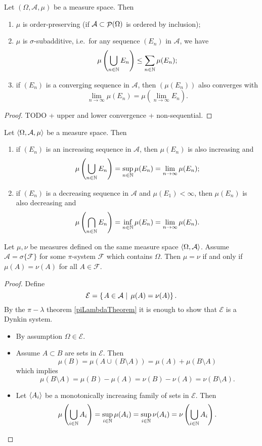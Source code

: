 \begin{proposition} \label{measures}
Let $(\Omega, \mathcal{A}, \mu)$ be a measure space. Then
\begin{enumerate}
\item $\mu$ is order-preserving (if $\mathcal{A}\subset \mathop{\mathcal{P}}(\Omega)$ is ordered by inclusion);
\item $\mu$ is $\sigma$-subadditive, i.e.\ for any sequence $(E_n)$ in $\mathcal{A}$, we have
\[ \mu\left(\bigcup_{n\in\mathbb{N}}E_n\right) \leq \sum_{n\in\mathbb{N}}\mu(E_n); \]
\item if $(E_n)$ is a converging sequence in $\mathcal{A}$, then $(\mu(E_n))$ also converges with
\[ \lim_{n\to\infty}\mu(E_n) = \mu\left(\lim_{n\to\infty}E_n\right). \]
\end{enumerate}
\end{proposition}
\begin{proof}
TODO + upper  and lower convergence + non-sequential.
\end{proof}
\begin{corollary}
Let $\left\langle \Omega, \mathcal{A}, \mu \right\rangle$ be a measure space. Then
\begin{enumerate}
\item if $(E_n)$ is an increasing sequence in $\mathcal{A}$, then $\mu(E_n)$ is also increasing and
\[ \mu\left(\bigcup_{n\in\mathbb{N}}E_n\right) = \sup_{n\in\mathbb{N}}\mu(E_n) = \lim_{n\to\infty}\mu(E_n); \]
\item if $(E_n)$ is a decreasing sequence in $\mathcal{A}$ and $\mu(E_1)<\infty$, then $\mu(E_n)$ is also decreasing and
\[ \mu\left(\bigcap_{n\in\mathbb{N}}E_n\right) = \inf_{n\in\mathbb{N}}\mu(E_n) = \lim_{n\to\infty}\mu(E_n). \]
\end{enumerate}
\end{corollary}
\begin{corollary}
Let $\mu,\nu$ be measures defined on the same measure space $\left\langle \Omega, \mathcal{A} \right\rangle$. Assume $\mathcal{A} = \sigma\{\mathcal{F}\}$ for some $\pi$-system $\mathcal{F}$ which contains $\Omega$. Then $\mu = \nu$ \textup{if and only if} $\mu(A) = \nu(A)$ for all $A\in\mathcal{F}$.
\end{corollary}
\begin{proof}
Define
\[ \mathcal{E} = \left\{\left. A\in\mathcal{A} \;\right|\; \mu(A) = \nu(A) \right\}. \]
By the $\pi-\lambda$ theorem \ref{piLambdaTheorem} it is enough to show that $\mathcal{E}$ is a Dynkin system.
\begin{itemize}
\item By assumption $\Omega\in \mathcal{E}$.
\item Assume $A\subset B$ are sets in $\mathcal{E}$. Then
\[ \mu(B) = \mu(A \cup (B\setminus A)) = \mu(A) + \mu(B\setminus A) \]
which implies
\[ \mu(B\setminus A) = \mu(B) - \mu(A) = \nu(B) - \nu(A) = \nu(B\setminus A). \]
\item Let $\left\langle A_i \right\rangle$ be a monotonically increasing family of sets in $\mathcal{E}$. Then
\[ \mu\left(\bigcup_{i\in\mathbb{N}}A_i\right) = \sup_{i\in\mathbb{N}}\mu(A_i) = \sup_{i\in\mathbb{N}}\nu(A_i) = \nu\left(\bigcup_{i\in\mathbb{N}}A_i\right). \]
\end{itemize}
\end{proof}

